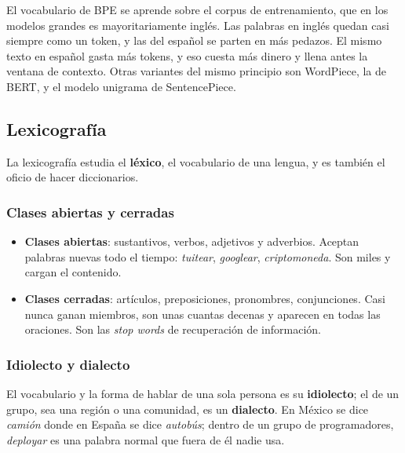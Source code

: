 \documentclass[11pt,letterpaper]{article}
\begin{document}
\begin{ojo}
    El vocabulario de BPE se aprende sobre el corpus de entrenamiento,
    que en los modelos grandes es mayoritariamente inglés. Las palabras
    en inglés quedan casi siempre como un token, y las del español se
    parten en más pedazos. El mismo texto en español gasta más tokens,
    y eso cuesta más dinero y llena antes la ventana de contexto. Otras
    variantes del mismo principio son WordPiece, la de BERT, y el
    modelo unigrama de SentencePiece.
\end{ojo}


\subsection*{Lexicografía}

La lexicografía estudia el \textbf{léxico}, el vocabulario de una
lengua, y es también el oficio de hacer diccionarios.

\subsubsection*{Clases abiertas y cerradas}

\begin{itemize}[itemsep=0.3em]
    \item \textbf{Clases abiertas}: sustantivos, verbos, adjetivos y
          adverbios. Aceptan palabras nuevas todo el tiempo:
          \textit{tuitear}, \textit{googlear}, \textit{criptomoneda}.
          Son miles y cargan el contenido.
    \item \textbf{Clases cerradas}: artículos, preposiciones,
          pronombres, conjunciones. Casi nunca ganan miembros, son unas
          cuantas decenas y aparecen en todas las oraciones. Son las
          \textit{stop words} de recuperación de información.
\end{itemize}

\subsubsection*{Idiolecto y dialecto}

El vocabulario y la forma de hablar de una sola persona es su
\textbf{idiolecto}; el de un grupo, sea una región o una comunidad, es
un \textbf{dialecto}. En México se dice \textit{camión} donde en
España se dice \textit{autobús}; dentro de un grupo de programadores,
\textit{deployar} es una palabra normal que fuera de él nadie usa.
\end{document}
